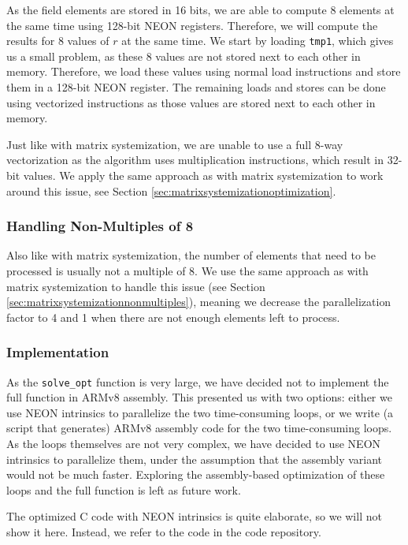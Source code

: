 \documentclass[11pt,a4paper]{report}
\theoremstyle{definition}
\begin{document}
As the field elements are stored in 16 bits, we are able to compute 8 elements at the same time using 128-bit NEON registers. Therefore, we will compute the results for 8 values of $r$ at the same time. We start by loading \texttt{tmp1}, which gives us a small problem, as these 8 values are not stored next to each other in memory. Therefore, we load these values using normal load instructions and store them in a 128-bit NEON register. The remaining loads and stores can be done using vectorized instructions as those values are stored next to each other in memory.

Just like with matrix systemization, we are unable to use a full 8-way vectorization as the algorithm uses multiplication instructions, which result in 32-bit values. We apply the same approach as with matrix systemization to work around this issue, see Section \ref{sec:matrixsystemizationoptimization}.

\subsubsection{Handling Non-Multiples of 8}
Also like with matrix systemization, the number of elements that need to be processed is usually not a multiple of 8. We use the same approach as with matrix systemization to handle this issue (see Section \ref{sec:matrixsystemizationnonmultiples}), meaning we decrease the parallelization factor to 4 and 1 when there are not enough elements left to process.

\subsubsection{Implementation}
As the \texttt{solve\_opt} function is very large, we have decided not to implement the full function in ARMv8 assembly. This presented us with two options: either we use NEON intrinsics to parallelize the two time-consuming loops, or we write (a script that generates) ARMv8 assembly code for the two time-consuming loops. As the loops themselves are not very complex, we have decided to use NEON intrinsics to parallelize them, under the assumption that the assembly variant would not be much faster. Exploring the assembly-based optimization of these loops and the full function is left as future work.

The optimized C code with NEON intrinsics is quite elaborate, so we will not show it here. Instead, we refer to the code in the code repository.
\end{document}

